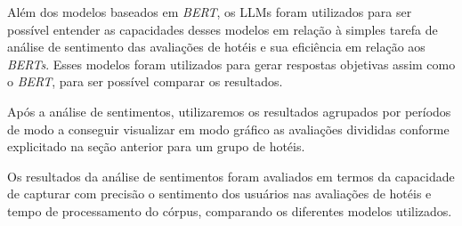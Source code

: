 Além dos modelos baseados em \textit{BERT}, os LLMs foram utilizados para ser possível entender as capacidades desses modelos em relação à simples tarefa de análise de sentimento das avaliações de hotéis e sua eficiência em relação aos \textit{BERTs}. Esses modelos foram utilizados para gerar respostas objetivas assim como o \textit{BERT}, para ser possível comparar os resultados.

Após a análise de sentimentos, utilizaremos os resultados agrupados por períodos de modo a conseguir visualizar em modo gráfico as avaliações divididas conforme explicitado na seção anterior para um grupo de hotéis.

Os resultados da análise de sentimentos foram avaliados em termos da capacidade de capturar com precisão o sentimento dos usuários nas avaliações de hotéis e tempo de processamento do córpus, comparando os diferentes modelos utilizados.
